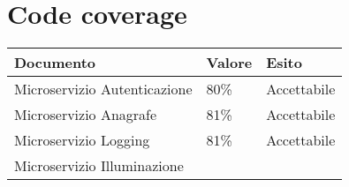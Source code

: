 \section{Code coverage}

\begin{center}
    \begin{xltabular}{\linewidth}{|l|l|l|}
    \hline
    \textbf{Documento} & \textbf{Valore} & \textbf{Esito} \\
    \hline
     Microservizio Autenticazione & 80\% & Accettabile \\
     Microservizio Anagrafe & 81\% & Accettabile \\
     Microservizio Logging & 81\% & Accettabile \\
     Microservizio Illuminazione &  &  \\
    \hline

    \end{xltabular}
\end{center}